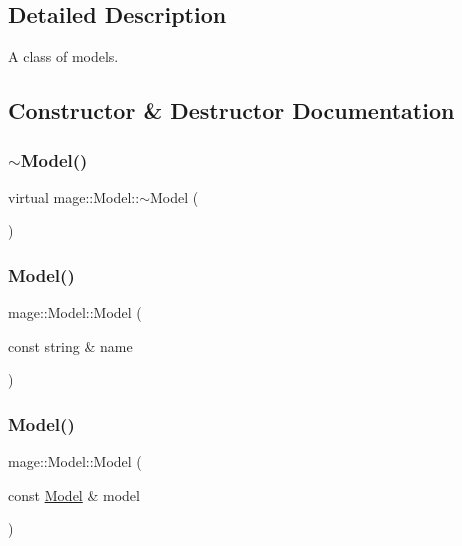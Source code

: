 \subsection{Detailed Description}
A class of models. 

\subsection{Constructor \& Destructor Documentation}
\hypertarget{classmage_1_1_model_afc6e31cb05ca98c456db56a3e03743d7}{}\label{classmage_1_1_model_afc6e31cb05ca98c456db56a3e03743d7} 
\subsubsection{\texorpdfstring{$\sim$\+Model()}{~Model()}}
{\footnotesize\ttfamily virtual mage\+::\+Model\+::$\sim$\+Model (\begin{DoxyParamCaption}{ }\end{DoxyParamCaption})\hspace{0.3cm}{\ttfamily [virtual]}}

\hypertarget{classmage_1_1_model_adc37cc2030a93cde5da20f9a941c060e}{}\label{classmage_1_1_model_adc37cc2030a93cde5da20f9a941c060e} 
\subsubsection{\texorpdfstring{Model()}{Model()}\hspace{0.1cm}{\footnotesize\ttfamily [1/2]}}
{\footnotesize\ttfamily mage\+::\+Model\+::\+Model (\begin{DoxyParamCaption}\item[{const string \&}]{name }\end{DoxyParamCaption})\hspace{0.3cm}{\ttfamily [protected]}}

\hypertarget{classmage_1_1_model_ac5f1d340bbfefd30bec3e6343a86059a}{}\label{classmage_1_1_model_ac5f1d340bbfefd30bec3e6343a86059a} 
\subsubsection{\texorpdfstring{Model()}{Model()}\hspace{0.1cm}{\footnotesize\ttfamily [2/2]}}
{\footnotesize\ttfamily mage\+::\+Model\+::\+Model (\begin{DoxyParamCaption}\item[{const \hyperlink{classmage_1_1_model}{Model} \&}]{model }\end{DoxyParamCaption})\hspace{0.3cm}{\ttfamily [protected]}}



